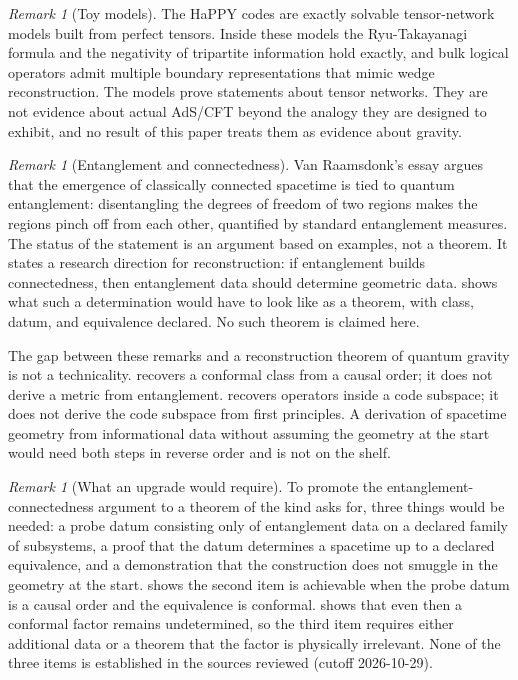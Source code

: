 \documentclass[11pt,letterpaper]{article}
\theoremstyle{definition}
\theoremstyle{remark}
\newtheorem{remark}[theorem]{Remark}
\begin{document}
\begin{remark}[Toy models]\label{rem:happy}
The HaPPY codes \cite{haappy} are exactly solvable tensor-network models built from perfect tensors. Inside these models the Ryu-Takayanagi formula and the negativity of tripartite information hold exactly, and bulk logical operators admit multiple boundary representations that mimic wedge reconstruction. The models prove statements about tensor networks. They are not evidence about actual AdS/CFT beyond the analogy they are designed to exhibit, and no result of this paper treats them as evidence about gravity.
\end{remark}

\begin{remark}[Entanglement and connectedness]\label{rem:vanraamsdonk}
Van Raamsdonk's essay \cite{vanraamsdonk} argues that the emergence of classically connected spacetime is tied to quantum entanglement: disentangling the degrees of freedom of two regions makes the regions pinch off from each other, quantified by standard entanglement measures. The status of the statement is an argument based on examples, not a theorem. It states a research direction for reconstruction: if entanglement builds connectedness, then entanglement data should determine geometric data.  shows what such a determination would have to look like as a theorem, with class, datum, and equivalence declared. No such theorem is claimed here.
\end{remark}

The gap between these remarks and a reconstruction theorem of quantum gravity is not a technicality.  recovers a conformal class from a causal order; it does not derive a metric from entanglement.  recovers operators inside a code subspace; it does not derive the code subspace from first principles. A derivation of spacetime geometry from informational data without assuming the geometry at the start would need both steps in reverse order and is not on the shelf.

\begin{remark}[What an upgrade would require]\label{rem:upgrade}
To promote the entanglement-connectedness argument \cite{vanraamsdonk} to a theorem of the kind  asks for, three things would be needed: a probe datum consisting only of entanglement data on a declared family of subsystems, a proof that the datum determines a spacetime up to a declared equivalence, and a demonstration that the construction does not smuggle in the geometry at the start.  shows the second item is achievable when the probe datum is a causal order and the equivalence is conformal.  shows that even then a conformal factor remains undetermined, so the third item requires either additional data or a theorem that the factor is physically irrelevant. None of the three items is established in the sources reviewed (cutoff 2026-10-29).
\end{remark}
\end{document}
